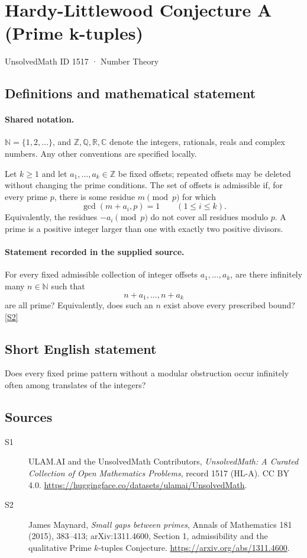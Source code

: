 \documentclass[11pt]{article}
\newcommand{\sref}[2]{\hyperlink{source:#1:#2}{[S#2]}}
\begin{document}
\setcounter{section}{1516}
\section{Hardy-Littlewood Conjecture A (Prime k-tuples)}\label{1517}
{\small\sffamily UnsolvedMath ID 1517 · Number Theory}
\subsection{Definitions and mathematical statement}

\paragraph{Shared notation.}$\mathbb N=\{1,2,\ldots\}$, and $\mathbb Z,\mathbb Q,\mathbb R,\mathbb C$ denote the integers, rationals, reals and complex numbers. Any other conventions are specified locally.


Let \(k\ge1\) and let \(a_1,\ldots,a_k\in\mathbb Z\) be fixed
offsets; repeated offsets may be deleted without changing the prime
conditions. The set of offsets is admissible if, for every prime \(p\),
there is some residue \(m\pmod p\) for which
\[
                  \gcd(m+a_i,p)=1\qquad(1\le i\le k).
\]
Equivalently, the residues \(-a_i\pmod p\) do not cover all residues
modulo \(p\). A prime is a positive integer larger than one with
exactly two positive divisors.
\paragraph{Statement recorded in the supplied source.}
For every fixed admissible collection of integer offsets
\(a_1,\ldots,a_k\), are there infinitely many \(n\in\mathbb N\) such that
\[
                         n+a_1,\ldots,n+a_k
\]
are all prime? Equivalently, does such an \(n\) exist above every
prescribed bound? \sref{1517}{2}
\subsection{Short English statement}
Does every fixed prime pattern without a modular obstruction occur infinitely often among translates of the integers?
\subsection{Sources}
\begin{description}
\item[\hypertarget{source:1517:1}{S1}] ULAM.AI and the UnsolvedMath Contributors, \emph{UnsolvedMath: A Curated Collection of Open Mathematics Problems}, record 1517 (HL-A). CC BY 4.0. \url{https://huggingface.co/datasets/ulamai/UnsolvedMath}.
\item[\hypertarget{source:1517:2}{S2}] James Maynard, \emph{Small gaps between primes}, Annals of Mathematics 181 (2015), 383--413; arXiv:1311.4600, Section 1, admissibility and the qualitative Prime $k$-tuples Conjecture. \url{https://arxiv.org/abs/1311.4600}.
\end{description}
\label{end:1517}
\end{document}

